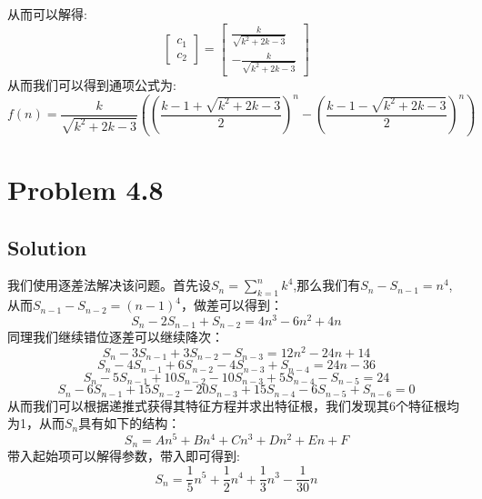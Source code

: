 \documentclass[a4paper]{ctexart}
\begin{document}
从而可以解得:
\begin{equation}
    \left[
        \begin{array}{c}
            c_1 \\
            c_2
        \end{array}
        \right]
    =
    \left[
        \begin{array}{c}
            \frac{k}{\sqrt{k^2+2k-3}} \\
            -\frac{k}{\sqrt{k^2+2k-3}}
        \end{array}
        \right]
\end{equation}
从而我们可以得到通项公式为:
\begin{equation}
    f(n)= \frac{k}{\sqrt{k^2+2k-3}}((\frac{k-1+\sqrt{k^2+2k-3}}{2})^n - (\frac{k-1-\sqrt{k^2+2k-3}}{2})^n)
\end{equation}

\section{Problem 4.8}
\subsection{Solution}
我们使用逐差法解决该问题。首先设$S_n = \sum_{k=1}^n k^4$,那么我们有$S_n-S_{n-1}=n^4$, 从而$S_{n-1}-S_{n-2}=(n-1)^4$，做差可以得到：
\begin{equation}
    S_{n}-2S_{n-1}+S_{n-2}=4n^3-6n^2+4n
\end{equation}
同理我们继续错位逐差可以继续降次：
\begin{equation}
    S_n-3S_{n-1}+3S_{n-2}-S_{n-3}=12n^2-24n+14
\end{equation}
\begin{equation}
    S_n-4S_{n-1}+6S_{n-2}-4S_{n-3}+S_{n-4}=24n-36
\end{equation}
\begin{equation}
    S_n-5S_{n-1}+10S_{n-2}-10S_{n-3}+5S_{n-4}-S_{n-5}=24
\end{equation}
\begin{equation}
    S_n-6S_{n-1}+15S_{n-2}-20S_{n-3}+15S_{n-4}-6S_{n-5}+S_{n-6}=0
\end{equation}
从而我们可以根据递推式获得其特征方程并求出特征根，我们发现其6个特征根均为1，从而$S_n$具有如下的结构：
\begin{equation}
    S_n= An^5+Bn^4+Cn^3+Dn^2+En+F
\end{equation}
带入起始项可以解得参数，带入即可得到:
\begin{equation}
    S_n=\frac{1}{5}n^5+\frac{1}{2}n^4+\frac{1}{3}n^3-\frac{1}{30}n
\end{equation}
\end{document}
